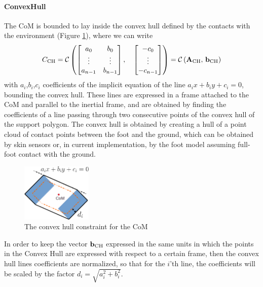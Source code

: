 \paragraph{ConvexHull}
The CoM is bounded to lay inside the convex hull defined by the contacts with the environment (Figure \ref{com_ch}), where we can write 
\begin{equation}
C_\text{CH} = \mathcal{C} \left( 
\begin{bmatrix}     a_0     & b_0     \\ 
                    \vdots  & \vdots  \\
                    a_{n-1} & b_{n-1} \\
\end{bmatrix}, \quad 
\begin{bmatrix} -c_0     \\ 
                \vdots   \\
                -c_{n-1} \\
\end{bmatrix} \right) = \mathcal{C} \left( \mathbf{A}_\text{CH},\, \mathbf{b}_\text{CH} \right)
\end{equation}
with $a_i$,$b_i$,$c_i$ coefficients of the implicit equation of the line $a_ix+b_iy+c_i=0$, bounding the convex hull. These lines are  expressed in a frame attached to the CoM and parallel to the inertial frame, and are obtained by finding the coefficients of a line passing through two consecutive points of the convex hull of the support polygon. The convex hull is obtained by creating a hull of a point cloud of contact points between the foot and the ground, which can be obtained by skin sensors or, in current implementation, by the foot model assuming full-foot contact with the ground.
\begin{figure}[hb!]
  \center
  \vspace*{0.05in}
    \includegraphics[width=0.3\textwidth]{images/wholebody/com_ch}
    \caption{The convex hull constraint for the CoM}\label{com_ch}
\end{figure}
In order to keep the vector $\mathbf{b}_\text{CH}$ expressed in the same units in which the points in the Convex Hull are expressed with respect to a certain frame, then the convex hull lines coefficients are normalized, so that for the $i$'th line, the coefficients will be scaled by the factor $d_i=\sqrt{a_i^2+b_i^2}$.



